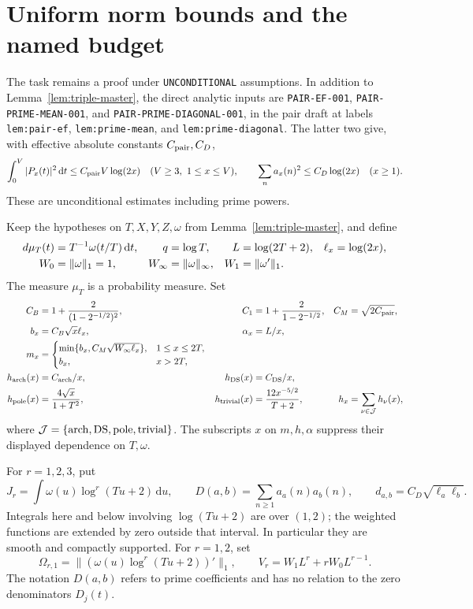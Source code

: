 \documentclass[11pt]{article}
\newcommand{\dd}{\,\mathrm d}
\begin{document}
\section{Uniform norm bounds and the named budget}

The task remains a proof under \texttt{UNCONDITIONAL} assumptions.
In addition to Lemma~\ref{lem:triple-master}, the direct analytic inputs are
\texttt{PAIR-EF-001}, \texttt{PAIR-PRIME-MEAN-001}, and
\texttt{PAIR-PRIME-DIAGONAL-001}, in the pair draft at labels
\texttt{lem:pair-ef}, \texttt{lem:prime-mean}, and
\texttt{lem:prime-diagonal}. The latter two give, with effective absolute
constants \(C_{\rm pair},C_D\),
\[
 \int_0^V|P_x(t)|^2\dd t\leq C_{\rm pair}V\log(2x)
 \quad(V\geq3,\ 1\leq x\leq V),\qquad
 \sum_n a_x(n)^2\leq C_D\log(2x)\quad(x\geq1).
\]
These are unconditional estimates including prime powers.

Keep the hypotheses on \(T,X,Y,Z,\omega\) from
Lemma~\ref{lem:triple-master}, and define
\begin{align}
 d\mu_T(t)&=T^{-1}\omega(t/T)\dd t,&
 q&=\log T,& L&=\log(2T+2),& \ell_x&=\log(2x),\notag\\
 W_0&=\|\omega\|_1=1,&W_\infty&=\|\omega\|_\infty,&
 W_1&=\|\omega'\|_1.&&\label{eq:uniform-parameters}
\end{align}
The measure \(\mu_T\) is a probability measure. Set
\begin{align}
 C_B&=1+\frac{2}{(1-2^{-1/2})^2},&
 C_1&=1+\frac{2}{1-2^{-1/2}},&
 C_M&=\sqrt{2C_{\rm pair}},\notag\\
 b_x&=C_B\sqrt{x}\ell_x,&\alpha_x&=L/x,&&\notag\\
 m_x&=
 \begin{cases}
 \min\{b_x,C_M\sqrt{W_\infty\ell_x}\},&1\leq x\leq2T,\\
 b_x,&x>2T,
 \end{cases}&&&&\label{eq:uniform-primitives}\\
 h_{\rm arch}(x)&=C_{\rm arch}/x,&
 h_{\rm DS}(x)&=C_{\rm DS}/x,\notag\\
 h_{\rm pole}(x)&=\frac{4\sqrt{x}}{1+T^2},&
 h_{\rm trivial}(x)&=\frac{12x^{-5/2}}{T+2},&
 h_x&=\sum_{\nu\in\mathcal J}h_\nu(x),\label{eq:uniform-remainders}
\end{align}
where \(\mathcal J=\{{\rm arch},{\rm DS},{\rm pole},{\rm trivial}\}\).
The subscripts \(x\) on \(m,h,\alpha\) suppress their displayed
dependence on \(T,\omega\).

For \(r=1,2,3\), put
\[
 J_r=\int\omega(u)\log^r(Tu+2)\dd u,\qquad
 D(a,b)=\sum_{n\geq1}a_a(n)a_b(n),\qquad
 d_{a,b}=C_D\sqrt{\ell_a\ell_b}.
\]
Integrals here and below involving \(\log(Tu+2)\) are over \((1,2)\);
the weighted functions are extended by zero outside that interval.
In particular they are smooth and compactly supported. For \(r=1,2\), set
\begin{equation}\label{eq:uniform-Omega}
 \Omega_{r,1}=\|(\omega(u)\log^r(Tu+2))'\|_1,\qquad
 V_r=W_1L^r+rW_0L^{r-1}.
\end{equation}
The notation \(D(a,b)\) refers to prime coefficients and has no relation
to the zero denominators \(D_j(t)\).
\end{document}
